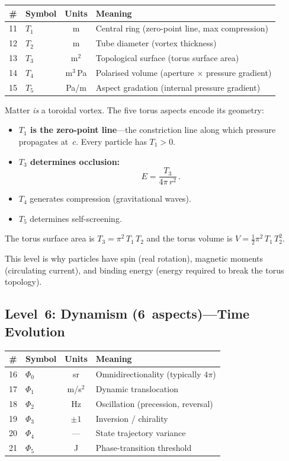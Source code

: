 \begin{center}
\begin{tabular}{clcl}
\hline
\# & Symbol & Units & Meaning \\
\hline
11 & $T_1$ & m & Central ring (zero-point line, max compression) \\
12 & $T_2$ & m & Tube diameter (vortex thickness) \\
13 & $T_3$ & m$^{2}$ & Topological surface (torus surface area) \\
14 & $T_4$ & m$^{3}$\,Pa & Polarised volume (aperture $\times$ pressure gradient) \\
15 & $T_5$ & Pa/m & Aspect gradation (internal pressure gradient) \\
\hline
\end{tabular}
\end{center}

Matter \emph{is} a toroidal vortex.  The five torus aspects encode its geometry:
\begin{itemize}
  \item \textbf{$T_1$ is the zero-point line}---the constriction line along which pressure propagates at~$c$.  Every particle has $T_1 > 0$.
  \item \textbf{$T_3$ determines occlusion:}
    \begin{equation}\label{eq:E-torus}
      E = \frac{T_3}{4\pi\,r^2}\,.
    \end{equation}
  \item $T_4$ generates compression (gravitational waves).
  \item $T_5$ determines self-screening.
\end{itemize}

\noindent The torus surface area is $T_3 = \pi^2\,T_1\,T_2$ and the torus volume is $V = \tfrac{1}{2}\pi^2\,T_1\,T_2^2$.

This level is why particles have spin (real rotation), magnetic moments (circulating current), and binding energy (energy required to break the torus topology).


\subsection{Level~6: Dynamism (6~aspects)---Time Evolution}

\begin{center}
\begin{tabular}{clcl}
\hline
\# & Symbol & Units & Meaning \\
\hline
16 & $\Phi_0$ & sr & Omnidirectionality (typically $4\pi$) \\
17 & $\Phi_1$ & m/s$^{2}$ & Dynamic translocation \\
18 & $\Phi_2$ & Hz & Oscillation (precession, reversal) \\
19 & $\Phi_3$ & $\pm1$ & Inversion / chirality \\
20 & $\Phi_4$ & --- & State trajectory variance \\
21 & $\Phi_5$ & J & Phase-transition threshold \\
\hline
\end{tabular}
\end{center}


